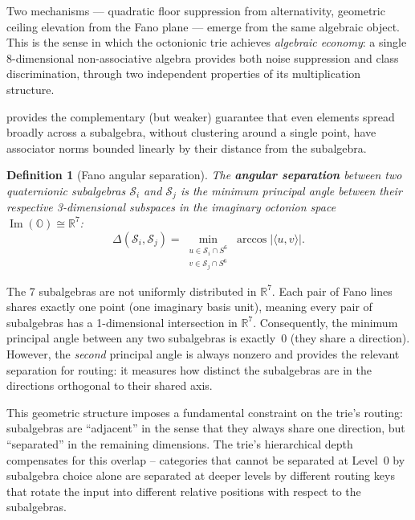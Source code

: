 \documentclass[11pt,a4paper]{article}
\newtheorem{definition}[theorem]{Definition}
\theoremstyle{definition}
\theoremstyle{remark}
\DeclareMathOperator{\Ima}{Im}
\newcommand{\Oct}{\mathbb{O}}
\newcommand{\Real}{\mathbb{R}}
\begin{document}
\noindent Two mechanisms --- quadratic floor suppression from alternativity, geometric ceiling elevation from the Fano plane --- emerge from the same algebraic object. This is the sense in which the octonionic trie achieves \emph{algebraic economy}: a single 8-dimensional non-associative algebra provides both noise suppression and class discrimination, through two independent properties of its multiplication structure.

 provides the complementary (but weaker) guarantee that even elements spread broadly across a subalgebra, without clustering around a single point, have associator norms bounded linearly by their distance from the subalgebra.

\begin{definition}[Fano angular separation]
\label{def:fano-sep}
The \textbf{angular separation} between two quaternionic subalgebras $\mathcal{S}_i$ and $\mathcal{S}_j$ is the minimum principal angle between their respective 3-dimensional subspaces in the imaginary octonion space $\Ima(\Oct) \cong \Real^7$:
\begin{equation}
  \Delta(\mathcal{S}_i, \mathcal{S}_j) = \min_{\substack{u \in \mathcal{S}_i \cap S^6 \\ v \in \mathcal{S}_j \cap S^6}} \arccos\lvert \langle u, v \rangle \rvert.
\end{equation}
\end{definition}

The 7 subalgebras are not uniformly distributed in $\Real^7$. Each pair of Fano lines shares exactly one point (one imaginary basis unit), meaning every pair of subalgebras has a 1-dimensional intersection in $\Real^7$. Consequently, the minimum principal angle between any two subalgebras is exactly~$0$ (they share a direction). However, the \emph{second} principal angle is always nonzero and provides the relevant separation for routing: it measures how distinct the subalgebras are in the directions orthogonal to their shared axis.

This geometric structure imposes a fundamental constraint on the trie's routing: subalgebras are ``adjacent'' in the sense that they always share one direction, but ``separated'' in the remaining dimensions. The trie's hierarchical depth compensates for this overlap -- categories that cannot be separated at Level~0 by subalgebra choice alone are separated at deeper levels by different routing keys that rotate the input into different relative positions with respect to the subalgebras.
\end{document}
